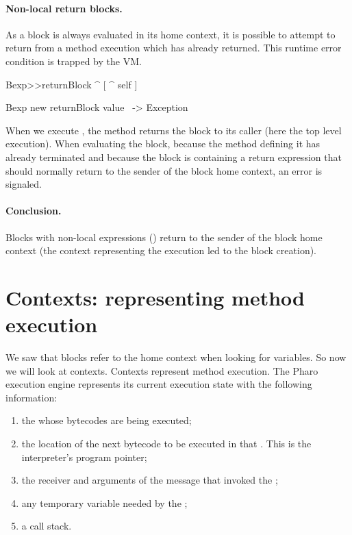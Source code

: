 \documentclass[a4paper,10pt,twoside]{book}
\begin{document}
\paragraph{Non-local return blocks.} As a block is always evaluated in its home context, it is possible to attempt to return from a method execution which has already returned. This runtime error condition is trapped by the VM.

\begin{code}{}
Bexp>>returnBlock
	^ [ ^ self ]

Bexp new returnBlock value ~-> Exception
\end{code}

When we execute , the method returns the block to its caller (here the top level execution). When evaluating the block, because the method defining it has already terminated and because the block is containing a return expression that should normally   return to the sender of the block home context, an error is signaled.


\paragraph{Conclusion.} Blocks with non-local expressions (\ct{[^ ...]})
return to the sender of the block home context (the context representing the execution led to the block creation).



\section{Contexts: representing method execution}
We saw that blocks refer to the home context when looking for variables. So now we will look at contexts. Contexts represent method execution. The Pharo execution engine represents its current execution state with the following information:

\begin{enumerate}
\item the  whose bytecodes are being executed;
\item the location of the next bytecode to be executed in that
. This is the interpreter's program pointer;
\item the receiver and arguments of the message that invoked the
;
\item any temporary variable needed by the ;
\item a call stack.
\end{enumerate}
\end{document}
